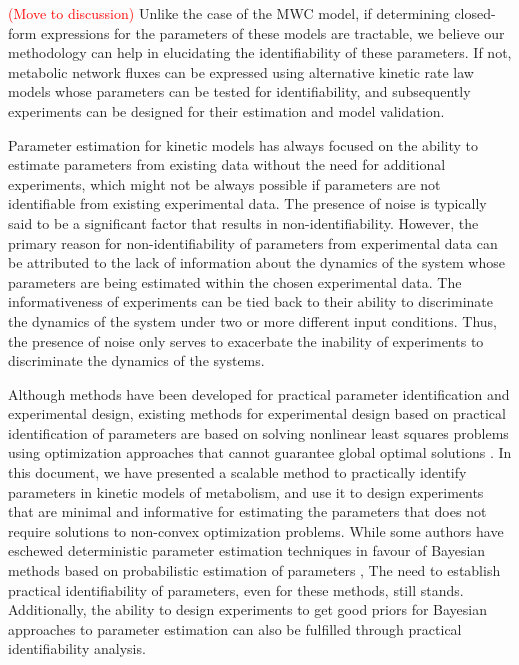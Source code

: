 \documentclass[10pt]{article}
\begin{document}
	\textcolor{red}{(Move to discussion)} Unlike the case of the MWC model, if determining closed-form expressions for the parameters of these models are tractable, we believe our methodology can help in elucidating the identifiability of these parameters. If not, metabolic network fluxes can be expressed using alternative kinetic rate law models whose parameters can be tested for identifiability, and subsequently experiments can be designed for their estimation and model validation.
	
	Parameter estimation for kinetic models has always focused on the ability to estimate parameters from existing data without the need for additional experiments, which might not be always possible if parameters are not identifiable from existing experimental data. The presence of noise is typically said to be a significant factor that results in non-identifiability. However, the primary reason for non-identifiability of parameters from experimental data can be attributed to the lack of information about the dynamics of the system whose parameters are being estimated within the chosen experimental data. The informativeness of experiments can be tied back to their ability to discriminate the dynamics of the system under two or more different input conditions. Thus, the presence of noise only serves to exacerbate the inability of experiments to discriminate the dynamics of the systems. 
	
	Although methods have been developed for practical parameter identification and experimental design, existing methods for experimental design based on practical identification of parameters are based on solving nonlinear least squares problems using optimization approaches that cannot guarantee global optimal solutions \parencite{Raue2009a}. In this document, we have presented a scalable method to practically identify parameters in kinetic models of metabolism, and use it to design experiments that are minimal and informative for estimating the parameters that does not require solutions to non-convex optimization problems. While some authors have eschewed deterministic parameter estimation techniques in favour of Bayesian methods based on probabilistic estimation of parameters \parencite{Saa2016, Saa2016a}, The need to establish practical identifiability of parameters, even for these methods, still stands. Additionally, the ability to design experiments to get good priors for Bayesian approaches to parameter estimation can also be fulfilled through practical identifiability analysis.
	
\end{document}
